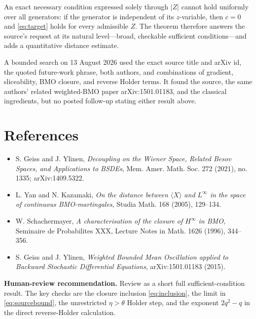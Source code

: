 \documentclass[11pt]{article}
\begin{document}
An exact necessary condition expressed solely through \(|Z|\) cannot hold
uniformly over all generators: if the generator is independent of its
\(z\)-variable, then \(c=0\) and \eqref{eq:target} holds for every admissible
\(Z\). The theorem therefore answers the source's request at its natural
level---broad, checkable sufficient conditions---and adds a quantitative
distance estimate.

A bounded search on 13 August 2026 used the exact source title and arXiv id,
the quoted future-work phrase, both authors, and combinations of gradient,
sliceability, BMO closure, and reverse Holder terms. It found the source,
the same authors' related weighted-BMO paper arXiv:1501.01183, and the
classical ingredients, but no posted follow-up stating either result above.

\section*{References}

\begin{itemize}[leftmargin=2em,nosep]
\item S. Geiss and J. Ylinen, \emph{Decoupling on the Wiener Space, Related
Besov Spaces, and Applications to BSDEs}, Mem. Amer. Math. Soc. 272 (2021),
no. 1335; arXiv:1409.5322.
\item L. Yan and N. Kazamaki, \emph{On the distance between
\(\langle X\rangle\) and \(L^\infty\) in the space of continuous
BMO-martingales}, Studia Math. 168 (2005), 129--134.
\item W. Schachermayer, \emph{A characterisation of the closure of
\(H^\infty\) in BMO}, Seminaire de Probabilites XXX, Lecture Notes in Math.
1626 (1996), 344--356.
\item S. Geiss and J. Ylinen, \emph{Weighted Bounded Mean Oscillation applied
to Backward Stochastic Differential Equations}, arXiv:1501.01183 (2015).
\end{itemize}

\medskip
\noindent\textbf{Human-review recommendation.}
Review as a short full sufficient-condition result. The key checks are the
closure inclusion \eqref{eq:inclusion}, the limit in
\eqref{eq:sourcebound}, the unrestricted \(\eta>\theta\) Holder step, and
the exponent \(2q^2-q\) in the direct reverse-Holder calculation.
\end{document}
